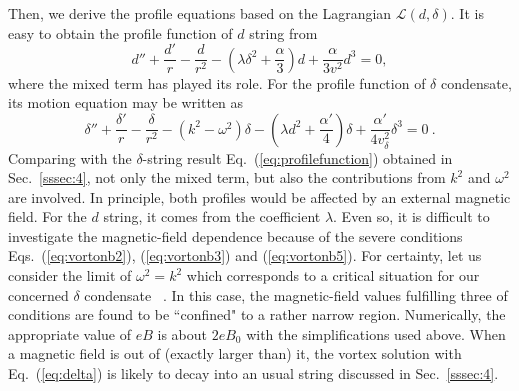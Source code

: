\documentclass[prd, showpacs,nofootinbib,amsmath,amssymb]{revtex4}
\begin{document}
Then, we derive the profile equations based on the Lagrangian $\mathcal{L}(d,\delta)$.
It is easy to obtain the profile function of $d$ string from
\begin{equation}
  \label{eq:deuler}
  d'' +\frac{d'}{r} - \frac{d}{r^2} - (\lambda \delta^2 + \frac{\alpha}{3})d + \frac{\alpha}{3v^2}d^3 = 0,
\end{equation}
where the mixed term has played its role.
For the profile function of $\delta$ condensate, its motion equation may be written as
\begin{equation}
  \label{eq:beuler}
  \delta'' +\frac{\delta'}{r} - \frac{\delta}{r^2} - (k^2 - \omega^2)\delta - (\lambda d^2 + \frac{\alpha'}{4})\delta + \frac{\alpha'}{4v_\delta^2}\delta^3 = 0 \ .
\end{equation}
Comparing with the $\delta$-string result Eq.~(\ref{eq:profilefunction}) obtained in Sec.~\ref{sssec:4},
not only the mixed term, but also the contributions from $k^2$ and $\omega^2$ are involved.
In principle, both profiles would be affected by an external magnetic field. For the $d$ string, it comes
from the coefficient $\lambda$. Even so, it is difficult to investigate the magnetic-field dependence
because of the severe conditions Eqs.~(\ref{eq:vortonb2}), (\ref{eq:vortonb3}) and (\ref{eq:vortonb5}).
For certainty, let us consider the limit of $\omega^2 = k^2$ which corresponds to a
critical situation for our concerned $\delta$ condensate ~\cite{lemperiere2003behaviour}.
In this case, the magnetic-field values fulfilling three of conditions are found to be ``confined" to a
rather narrow region.
Numerically, the appropriate value of $eB$ is about $2 eB_0$ with the simplifications used above.
When a magnetic field is out of (exactly larger than) it, the vortex solution with Eq.~(\ref{eq:delta})
is likely to decay into an usual string discussed in Sec.~\ref{sssec:4}.
\end{document}
